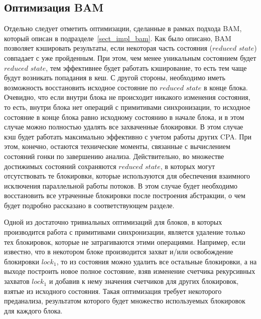 \subsection{Оптимизация BAM}
\label{subsect_lock_bam}
Отдельно следует отметить оптимизации, сделанные в рамках подхода BAM, который описан в подразделе~\ref{sect_impl_bam}.
Как было описано, BAM позволяет кэшировать результаты, если некоторая часть состояния ($reduced$ $state$) совпадает с уже пройденным. 
При этом, чем менее уникальным состоянием будет $reduced$ $state$, тем эффективнее будет работать кэширование, то есть тем чаще будут возникать попадания в кеш.
С другой стороны, необходимо иметь возможность восстановить исходное состояние по $reduced$ $state$ в конце блока.
Очевидно, что если внутри блока не происходит никакого изменения состояния, то есть, внутри блока нет операций с примитивами синхронизации, то исходное состояние в конце блока равно исходному состоянию в начале блока, и в этом случае можно полностью удалять все захваченные блокировки. 
В этом случае кэш будет работать максимально эффективно с учетом работы других CPA.
При этом, конечно, остаются технические моменты, связанные с вычислением состояний гонки по завершению анализа.
Действительно, во множестве достижимых состояний сохраняются $reduced$ $state$, в которых могут отсутствовать те блокировки, которые используются для обеспечения взаимного исключения параллельной работы потоков.
В этом случае будет необходимо восстановить все утраченные блокировки после построения абстракции, о чем будет подробно рассказано в соответствующем разделе.

Одной из достаточно тривиальных оптимизаций для блоков, в которых производится работа с примитивами синхронизации, является удаление только тех блокировок, которые не затрагиваются этими операциями. 
Например, если известно, что в некотором блоке производится захват и/или освобождение блокировки $lock_1$, то из состояния можно удалить все остальные блокировки, а на выходе построить новое полное состояние, взяв изменение счетчика рекурсивных захватов $lock_1$ и добавив к нему значения счетчиков для других блокировок, взятые из исходного состояния. 
Такая оптимизация требует некоторого преданализа, результатом которого будет множество используемых блокировок для каждого блока.


